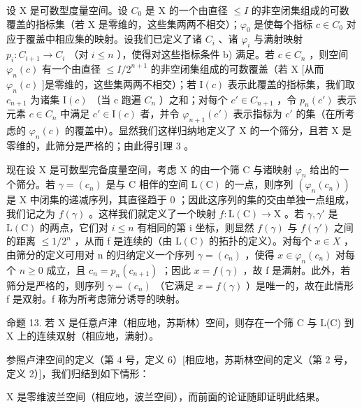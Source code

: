 设 X 是可数型度量空间。设 \(C_{0}\) 是 X 的一个由直径 \(\leqslant I\) 的非空闭集组成的可数覆盖的指标集（若 X 是零维的，这些集两两不相交）；\(\varphi_{0}\) 是使每个指标 \(c \in C_{0}\) 对应于覆盖中相应集的映射。设我们已定义了诸 \(C_{i}\) 、诸 \(\varphi_{i}\) 与满射映射 \(p_{i}: C_{i+1} \to C_{i}\) （对 \(i \leqslant n\) ），使得对这些指标条件 b) 满足。若 \(c \in C_{n}\) ，则空间 \(\varphi_{n}(c)\) 有一个由直径 \(\leqslant I/2^{n+1}\) 的非空闭集组成的可数覆盖（若 X {[}从而 \(\varphi_{n}(c)\) {]}是零维的，这些集两两不相交）；若 \(\mathrm{I}(c)\) 表示此覆盖的指标集，我们取 \(c_{n+1}\) 为诸集 \(\mathrm{I}(c)\) （当 c 跑遍 \(C_{n}\) ）之和；对每个 \(c' \in C_{n+1}\) ，令 \(p_{n}(c')\) 表示元素 \(c \in C_{n}\) 中满足 \(c' \in \mathrm{I}(c)\) 者，并令 \(\varphi_{n+1}(c')\) 表示指标为 \(c'\) 的集（在所考虑的 \(\varphi_{n}(c)\) 的覆盖中）。显然我们这样归纳地定义了 X 的一个筛分，且若 X 是零维的，此筛分是严格的；由此得引理 3 。

现在设 X 是可数型完备度量空间，考虑 X 的由一个筛 C 与诸映射 \(\varphi_{n}\) 给出的一个筛分。若 \(\gamma = (c_{n})\) 是与 C 相伴的空间 \(\mathrm{L}(\mathrm{C})\) 的一点，则序列 \((\varphi_{n}(c_{n}))\) 是 X 中闭集的递减序列，其直径趋于 0 ；因此这序列的集的交由单独一点组成，我们记之为 \(f(\gamma)\) 。这样我们就定义了一个映射 \(f: \mathrm{L}(\mathrm{C}) \to \mathrm{X}\) 。若 \(\gamma, \gamma'\) 是 \(\mathrm{L}(\mathrm{C})\) 的两点，它们对 \(i \leqslant n\) 有相同的第 i 坐标，则显然 \(f(\gamma)\) 与 \(f(\gamma')\) 之间的距离 \(\leqslant 1/2^{n}\) ，从而 f 是连续的（由 \(\mathrm{L}(\mathrm{C})\) 的拓扑的定义）。对每个 \(x \in X\) ，由筛分的定义可用对 n 的归纳定义一个序列 \(\gamma = (c_{n})\) ，使得 \(x \in \varphi_{n}(c_{n})\) 对每个 \(n \geqslant 0\) 成立，且 \(c_{n} = p_{n}(c_{n+1})\) ；因此 \(x = f(\gamma)\) ，故 f 是满射。此外，若筛分是严格的，则序列 \(\gamma = (c_{n})\) （它满足 \(x = f(\gamma)\) ）是唯一的，故在此情形 f 是双射。f 称为所考虑筛分诱导的映射。

命题 13. 若 X 是任意卢津（相应地，苏斯林）空间，则存在一个筛 C 与 L(C) 到 X 上的连续双射（相应地，满射）。

参照卢津空间的定义（第 4 号，定义 6）{[}相应地，苏斯林空间的定义（第 2 号，定义 2）{]}，我们归结到如下情形：

X 是零维波兰空间（相应地，波兰空间），而前面的论证随即证明此结果。

